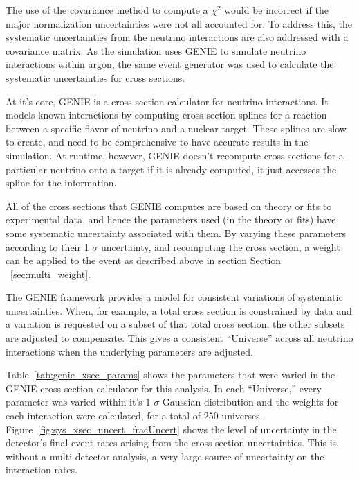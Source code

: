The use of the covariance method to compute a $\chi^2$ would be incorrect if the major normalization uncertainties were not all accounted for.  To address this, the systematic uncertainties from the neutrino interactions are also addressed with a covariance matrix.  As the simulation uses GENIE \cite{Andreopoulos:2009rq} to simulate neutrino interactions within argon, the same event generator was used to calculate the systematic uncertainties for cross sections.

At it's core, GENIE is a cross section calculator for neutrino interactions.  It models known interactions by computing cross section splines for a reaction between a specific flavor of neutrino and a nuclear target.  These splines are slow to create, and need to be comprehensive to have accurate results in the simulation.  At runtime, however, GENIE doesn't recompute cross sections for a particular neutrino onto a target if it is already computed, it just accesses the spline for the information.

All of the cross sections that GENIE computes are based on theory or fits to experimental data, and hence the parameters used (in the theory or fits) have some systematic uncertainty associated with them.  By varying these parameters according to their 1 $\sigma$ uncertainty, and recomputing the cross section, a weight can be applied to the event as described above in section Section ~\ref{sec:multi_weight}.

The GENIE framework provides a model for consistent variations of systematic uncertainties.  When, for example, a total cross section is constrained by data and a variation is requested on a subset of that total cross section, the other subsets are adjusted to compensate.  This gives a consistent ``Universe'' across all neutrino interactions when the underlying parameters are adjusted.

Table~\ref{tab:genie_xsec_params} shows the parameters that were varied in the GENIE cross section calculator for this analysis.  In each ``Universe,'' every parameter was varied within it's 1 $\sigma$ Gaussian distribution and the weights for each interaction were calculated, for a total of 250 universes.  Figure~\ref{fig:sys_xsec_uncert_fracUncert} shows the level of uncertainty in the detector's final \nue event rates arising from the cross section uncertainties.  This is, without a multi detector analysis, a very large source of uncertainty on the interaction rates.

